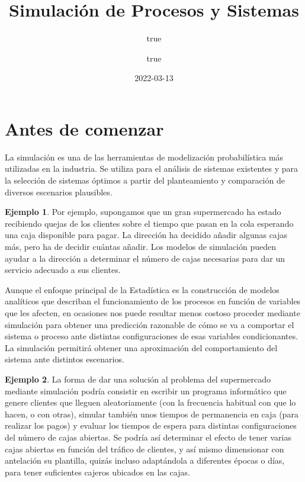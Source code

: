 \documentclass[
]{book}
\title{Simulación de Procesos y Sistemas}
\author{true \and true}
\date{2022-03-13}
\newenvironment{whitebox}{
  \definecolor{shadecolor}{rgb}{255, 255, 255}  
  \color{black}
  \begin{shaded}}
 {\end{shaded}}
\theoremstyle{definition}
\theoremstyle{definition}
\newtheorem{example}{Ejemplo}[chapter]
\theoremstyle{definition}
\theoremstyle{definition}
\theoremstyle{remark}
\begin{document}
\maketitle

{
\setcounter{tocdepth}{1}
\tableofcontents
}
\hypertarget{antes-de-comenzar}{%
\chapter*{Antes de comenzar}\label{antes-de-comenzar}}

La simulación es una de las herramientas de modelización probabilística más utilizadas en la industria. Se utiliza para el análisis de sistemas existentes y para la selección de sistemas óptimos a partir del planteamiento y comparación de diversos escenarios plausibles.

\begin{whitebox}

\begin{example}
Por ejemplo, supongamos que un gran supermercado ha estado recibiendo quejas de los clientes sobre el tiempo que pasan en la cola esperando una caja disponible para pagar. La dirección ha decidido añadir algunas cajas más, pero ha de decidir cuántas añadir. Los modelos de simulación pueden ayudar a la dirección a determinar el número de cajas necesarias para dar un servicio adecuado a sus clientes.
\end{example}

\end{whitebox}

Aunque el enfoque principal de la Estadística es la construcción de modelos analíticos que describan el funcionamiento de los procesos en función de variables que les afecten, en ocasiones nos puede resultar menos costoso proceder mediante simulación para obtener una predicción razonable de cómo se va a comportar el sistema o proceso ante distintas configuraciones de esas variables condicionantes. La simulación permitirá obtener una aproximación del comportamiento del sistema ante distintos escenarios.

\begin{whitebox}

\begin{example}
La forma de dar una solución al problema del supermercado mediante simulación podría consistir en escribir un programa informático que genere clientes que lleguen aleatoriamente (con la frecuencia habitual con que lo hacen, o con otras), simular también unos tiempos de permanencia en caja (para realizar los pagos) y evaluar los tiempos de espera para distintas configuraciones del número de cajas abiertas. Se podría así determinar el efecto de tener varias cajas abiertas en función del tráfico de clientes, y así mismo dimensionar con antelación su plantilla, quizás incluso adaptándola a diferentes épocas o días, para tener suficientes cajeros ubicados en las cajas.
\end{example}

\end{whitebox}
\end{document}
